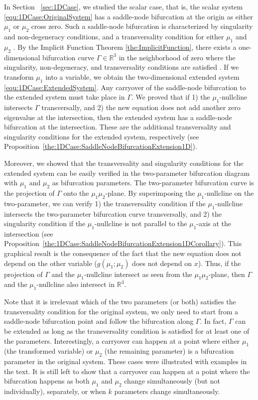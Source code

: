 \documentclass[12pt]{article}
\begin{document}
In Section ~\ref{sec:1DCase}, we studied the scalar case, that is, the scalar system \eqref{equ:1DCase:OriginalSystem} has a saddle-node bifurcation at the origin as either $\mu_{1}$ or $\mu_{2}$ cross zero. Such a saddle-node bifurcation is characterized by singularity and non-degeneracy conditions, and a transversality condition for either $\mu_{1}$ and $\mu_{2}$ \citep{Meiss2007}. By the Implicit Function Theorem \ref{the:ImplicitFunction}, there exists a one-dimensional bifurcation curve $\Gamma\in\mathbb{R}^{3}$ in the neighborhood of zero where the singularity, non-degeneracy, and transversality conditions are satisfied \citep{Kuznetsov2004}. If we transform $\mu_{1}$ into a variable, we obtain the two-dimensional extended system \eqref{equ:1DCase:ExtendedSystem}. Any carryover of the saddle-node bifurcation to the extended system must take place in $\Gamma$. We proved that if 1) the $\mu_{1}$-nullcline intersects $\Gamma$ transversally, and 2) the new equation does not add another zero eigenvalue at the intersection, then the extended system has a saddle-node bifurcation at the intersection. These are the additional transversality and singularity conditions for the extended system, respectively (see Proposition~\ref{the:1DCase:SaddleNodeBifurcationExtension1D}).

Moreover, we showed that the transversality and singularity conditions for the extended system can be easily verified in the two-parameter bifurcation diagram with $\mu_{1}$ and $\mu_{2}$ as bifurcation parameters. The two-parameter bifurcation curve is the projection of $\Gamma$ onto the $\mu_{1}\mu_{2}$-plane. By superimposing the $\mu_{1}$-nullcline on the two-parameter, we can verify 1) the transversality condition if the $\mu_{1}$-nullcline intersects the two-parameter bifurcation curve transversally, and 2) the singularity condition if the $\mu_{1}$-nullcline is not parallel to the $\mu_{1}$-axis at the intersection (see Proposition~\ref{the:1DCase:SaddleNodeBifurcationExtension1DCorollary}). This graphical result is the consequence of the fact that the new equation does not depend on the other variable ($g(\mu_{1}; \mu_{2})$ does not depend on $x$). Thus, if the projection of $\Gamma$ and the $\mu_{1}$-nullcline intersect as seen from the $\mu_{1}\mu_{2}$-plane, then $\Gamma$ and the $\mu_{1}$-nullcline also intersect in $\mathbb{R}^{3}$.

Note that it is irrelevant which of the two parameters (or both) satisfies the transversality condition for the original system, we only need to start from a saddle-node bifurcation point and follow the bifurcation along $\Gamma$. In fact, $\Gamma$ can be extended as long as the transversality condition is satisfied for at least one of the parameters. Interestingly, a carryover can happen at a point where either $\mu_{1}$ (the transformed variable) or $\mu_{2}$ (the remaining parameter) is a bifurcation parameter in the original system. These cases were illustrated with examples in the text. It is still left to show that a carryover can happen at a point where the bifurcation happens as both $\mu_{1}$ and $\mu_{2}$ change simultaneously (but not individually), separately, or when $k$ parameters change simultaneously.
\end{document}
